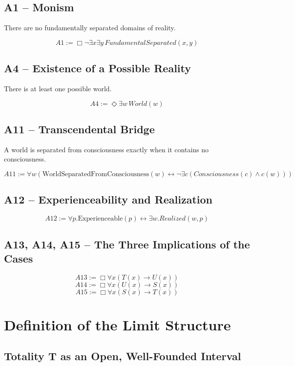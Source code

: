 \documentclass[
]{article}
\begin{document}
\subsection{A1 – Monism}

There are no fundamentally separated domains of reality.

\[
\boxed{A1 := \Box\neg\exists x\exists y\, FundamentalSeparated(x,y)}
\]

\subsection{A4 – Existence of a Possible Reality}

There is at least one possible world.

\[
\boxed{A4 := \Diamond\exists w\, World(w)}
\]

\subsection{A11 – Transcendental Bridge}

A world is separated from consciousness exactly when it contains no consciousness.

\[
\boxed{A11 := \forall w \left( \text{WorldSeparatedFromConsciousness}(w) \leftrightarrow \neg \exists c (Consciousness(c) \land c(w)) \right)}
\]

\subsection{A12 – Experienceability and Realization}

\[
\boxed{A12 := \forall p. \text{Experienceable}(p) \leftrightarrow \exists w. Realized(w, p)}
\]

\subsection{A13, A14, A15 – The Three Implications of the Cases}

\[
\boxed{A13 := \Box\forall x(T(x) \rightarrow U(x))}
\]
\[
\boxed{A14 := \Box\forall x(U(x) \rightarrow S(x))}
\]
\[
\boxed{A15 := \Box\forall x(S(x) \rightarrow T(x))}
\]

\section{Definition of the Limit Structure}

\subsection{Totality T as an Open, Well-Founded Interval}
\end{document}
